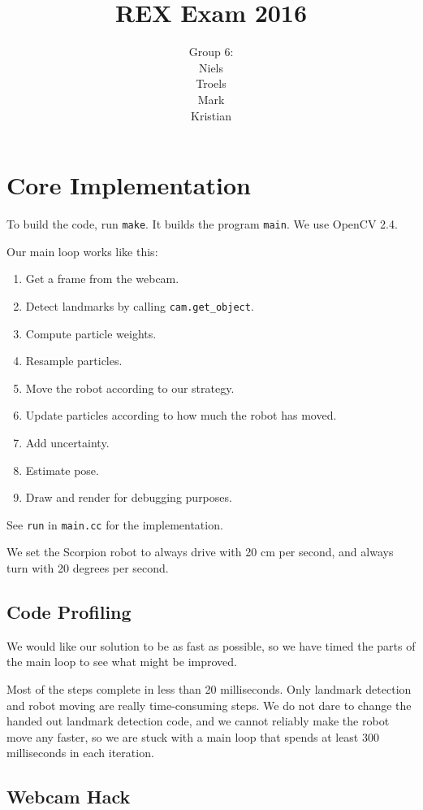 \documentclass[a4paper,12pt]{article}
\title{REX Exam 2016}
\author{Group 6:\\Niels\\Troels\\Mark\\Kristian}
\begin{document}
\maketitle
\newpage

\section{Core Implementation}

To build the code, run \texttt{make}.  It builds the program \texttt{main}.  We
use OpenCV 2.4.

Our main loop works like this:

\begin{enumerate}
\item Get a frame from the webcam.
\item Detect landmarks by calling \texttt{cam.get_object}.
\item Compute particle weights.
\item Resample particles.
\item Move the robot according to our strategy.
\item Update particles according to how much the robot has moved.
\item Add uncertainty.
\item Estimate pose.
\item Draw and render for debugging purposes.
\end{enumerate}

See \texttt{run} in \texttt{main.cc} for the implementation.

We set the Scorpion robot to always drive with 20 cm per second, and always turn
with 20 degrees per second.


\subsection{Code Profiling}

We would like our solution to be as fast as possible, so we have timed the parts
of the main loop to see what might be improved.

Most of the steps complete in less than 20 milliseconds.  Only landmark
detection and robot moving are really time-consuming steps.  We do not dare to
change the handed out landmark detection code, and we cannot reliably make the
robot move any faster, so we are stuck with a main loop that spends at least 300
milliseconds in each iteration.


\subsection{Webcam Hack}
\end{document}

